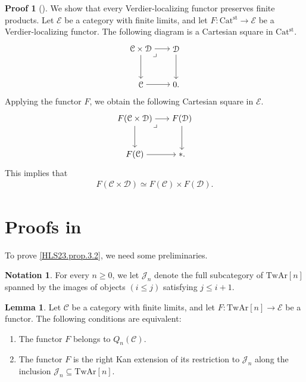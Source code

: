 \documentclass[a4paper,dvipdfmx,11pt,reqno]{amsart}
\newcommand{\C}{\mathcal{C}}
\newcommand{\D}{\mathcal{D}}
\newcommand{\E}{\mathcal{E}}
\newcommand{\J}{\mathcal{J}}
\newcommand{\Catst}{\mathrm{Cat^{st}}}
\newcommand{\TwAr}{\mathrm{TwAr}}
\theoremstyle{definition}
\newtheorem{lemma}[theorem]{Lemma}
\newtheorem{notation}[theorem]{Notation}
\newtheorem{newproof}[theorem]{Proof}
\begin{document}
\begin{newproof}[] \label{proof_of_HLS23.obs.2.2}
  We show that every Verdier-localizing functor preserves finite products.
  Let $\E$ be a category with finite limits, and let $F : \Catst \to \E$ be a Verdier-localizing functor.
  The following diagram is a Cartesian square in $\Catst$.
  \[\begin{tikzpicture}[auto,->] 
    \node (tl) at (0,1.5) {$\C \times \D$}; 
    \node (tr) at (1.5,1.5) {$\D$};
    \node (bl) at (0,0) {$\C$}; 
    \node (br) at (1.5,0) {$0.$}; 
    \draw (tl) -- node {} (tr); 
    \draw (bl) -- node[swap] {} (br); 
    \draw (tl) -- node[swap] {} (bl);
    \draw (tr) -- node {} (br); 
    \node at (tl.south east) {$\lrcorner$};
  \end{tikzpicture}\]
  Applying the functor $F$, we obtain the following Cartesian square in $\E$.
  \[\begin{tikzpicture}[auto,->] 
    \node (tl) at (0,1.5) {$F(\C \times \D)$}; 
    \node (tr) at (2,1.5) {$F(\D)$};
    \node (bl) at (0,0) {$F(\C)$}; 
    \node (br) at (2,0) {$\ast.$}; 
    \draw (tl) -- node {} (tr); 
    \draw (bl) -- node[swap] {} (br); 
    \draw (tl) -- node[swap] {} (bl);
    \draw (tr) -- node {} (br); 
    \node at (tl.south east) {$\lrcorner$};
  \end{tikzpicture}\]
  This implies that 
  \begin{align*}
    F(\C \times \D) \simeq F(\C) \times F(\D).
  \end{align*}
\end{newproof}


\section{Proofs in }

To prove \cref{HLS23.prop.3.2}, we need some preliminaries.

\begin{notation}
  For every $n \geq 0$, we let $\J_n$ denote the full subcategory of $\TwAr[n]$ spanned by the images of objects $(i \leq j)$ satisfying $j \leq i+1$.
\end{notation}

\begin{lemma} \label{Ber.lem.4.28}
  Let $\C$ be a category with finite limits, and let $F : \TwAr[n] \to \E$ be a functor.
  The following conditions are equivalent:
  \begin{enumerate}
    \item The functor $F$ belongs to $Q_n(\C)$.
    \item The functor $F$ is the right Kan extension of its restriction to $\J_n$ along the inclusion $\J_n \subseteq \TwAr[n]$.
  \end{enumerate}
\end{lemma}
\end{document}
